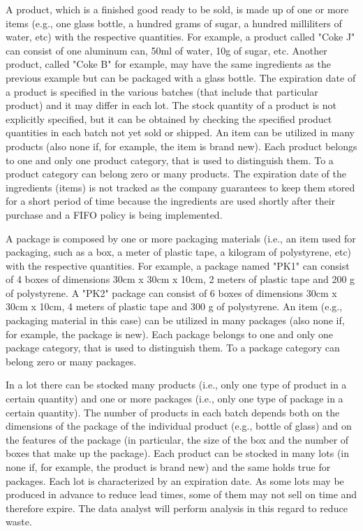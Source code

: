 A product, which is a finished good ready to be sold, is made up of one or more items (e.g., one glass bottle, a hundred grams of sugar, a hundred milliliters of water, etc) with the respective quantities. For example, a product called "Coke J" can consist of one aluminum can, 50ml of water, 10g of sugar, etc. Another product, called "Coke B" for example, may have the same ingredients as the previous example but can be packaged with a glass bottle. The expiration date of a product is specified in the various batches (that include that particular product) and it may differ in each lot. The stock quantity of a product is not explicitly specified, but it can be obtained by checking the specified product quantities in each batch not yet sold or shipped. An item can be utilized in many products (also none if, for example, the item is brand new). Each product belongs to one and only one product category, that is used to distinguish them. To a product category can belong zero or many products. The expiration date of the ingredients (items) is not tracked as the company guarantees to keep them stored for a short period of time because the ingredients are used shortly after their purchase and a FIFO policy is being implemented.

A package is composed by one or more packaging materials (i.e., an item used for packaging, such as a box, a meter of plastic tape, a kilogram of polystyrene, etc) with the respective quantities. For example, a package named "PK1" can consist of 4 boxes of dimensions 30cm x 30cm x 10cm, 2 meters of plastic tape and 200 g of polystyrene. A "PK2" package can consist of 6 boxes of dimensions 30cm x 30cm x 10cm, 4 meters of plastic tape and 300 g of polystyrene. An item (e.g., packaging material in this case) can be utilized in many packages (also none if, for example, the package is new). Each package belongs to one and only one package category, that is used to distinguish them. To a package category can belong zero or many packages.

In a lot there can be stocked many products (i.e., only one type of product in a certain quantity) and one or more packages (i.e., only one type of package in a certain quantity). The number of products in each batch depends both on the dimensions of the package of the individual product (e.g., bottle of glass) and on the features of the package (in particular, the size of the box and the number of boxes that make up the package). Each product can be stocked in many lots (in none if, for example, the product is brand new) and the same holds true for packages. Each lot is characterized by an expiration date. As some lots may be produced in advance to reduce lead times, some of them may not sell on time and therefore expire. The data analyst will perform analysis in this regard to reduce waste.

